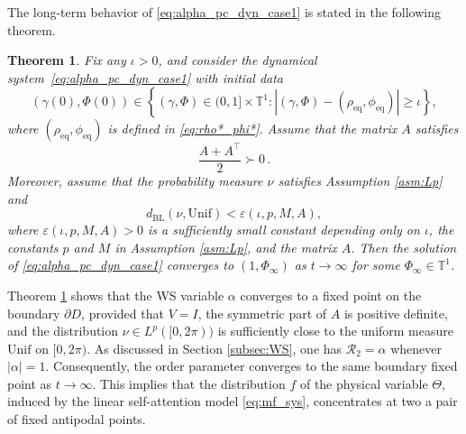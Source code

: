 \documentclass[10pt]{article}
\newtheorem{theorem}{Theorem}[section]
\theoremstyle{definition}
\theoremstyle{definition}
\numberwithin{equation}{section}
\newcommand{\BBT}{\mathbb{T}}
\newcommand{\CR}{\mathcal{R}}
\newcommand{\eq}{\mathrm{eq}}
\newcommand{\BL}{\mathrm{BL}}
\newcommand{\Unif}{\mathrm{Unif}}
\begin{document}
The long-term behavior of \eqref{eq:alpha_pc_dyn_case1} is stated in the following theorem.
\begin{theorem}\label{thm:case_1stab}
Fix any $\iota > 0$, and consider the dynamical system~\eqref{eq:alpha_pc_dyn_case1} with initial data
\begin{equation}\label{eq:case1_stab_initial_data}
(\gamma(0), \Phi(0)) \in \left\{ (\gamma, \Phi) \in (0,1] \times \BBT^1: |(\gamma, \Phi) - (\rho_{\eq}, \phi_{\eq})| \geq \iota \right\},
\end{equation}
where $(\rho_{\eq}, \phi_{\eq})$ is defined in \eqref{eq:rho*_phi*}.
Assume that the matrix $A$ satisfies 
\begin{equation}\label{eq:case_1_stab_A_condi}
\frac{A + A^{\top}}{2} \succ 0 \, .
\end{equation}
Moreover, assume that the probability measure $\nu$ satisfies Assumption \ref{asm:Lp} and
\begin{equation}\label{eq:case_1_stab_close_to_unif}
 d_{\BL} (\nu, \Unif) < \varepsilon(\iota, p, M, A),
\end{equation}
where $\varepsilon(\iota, p, M, A) > 0$ is a sufficiently small constant depending only on $\iota$, the constants $p$ and $M$ in Assumption \ref{asm:Lp}, and the matrix $A$.
Then the solution of \eqref{eq:alpha_pc_dyn_case1} converges to $(1, \Phi_{\infty})$ as $t \rightarrow \infty$ for some $\Phi_{\infty} \in \BBT^1$.
\end{theorem}

Theorem \ref{thm:case_1stab} shows that the WS variable $\alpha$ converges to a fixed point on the boundary $\partial D$, provided that $V = I$, the symmetric part of $A$ is positive definite, and the distribution $\nu \in L^p([0,2\pi))$ is sufficiently close to the uniform measure $\Unif$ on $[0,2\pi)$. 
As discussed in Section \ref{subsec:WS}, one has $\CR_2 = \alpha$ whenever $|\alpha| = 1$.
Consequently, the order parameter converges to the same boundary fixed point as $t \rightarrow \infty$. 
This implies that the distribution $f$ of the physical variable $\Theta$, induced by the linear self-attention model \eqref{eq:mf_sys}, concentrates at two a pair of fixed antipodal points. 
\end{document}
